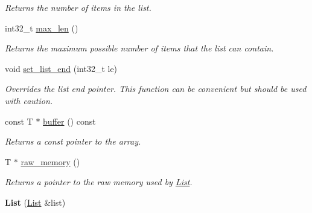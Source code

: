 \begin{DoxyCompactItemize}
\begin{DoxyCompactList}\small\item\em Returns the number of items in the list. \end{DoxyCompactList}\item 
\hypertarget{classetk_1_1_list_a360b0d7b0d8c3d48bfc976669cb12b24}{int32\-\_\-t \hyperlink{classetk_1_1_list_a360b0d7b0d8c3d48bfc976669cb12b24}{max\-\_\-len} ()}\label{classetk_1_1_list_a360b0d7b0d8c3d48bfc976669cb12b24}

\begin{DoxyCompactList}\small\item\em Returns the maximum possible number of items that the list can contain. \end{DoxyCompactList}\item 
\hypertarget{classetk_1_1_list_a35ccd11219bb888932e4957156bcab24}{void \hyperlink{classetk_1_1_list_a35ccd11219bb888932e4957156bcab24}{set\-\_\-list\-\_\-end} (int32\-\_\-t le)}\label{classetk_1_1_list_a35ccd11219bb888932e4957156bcab24}

\begin{DoxyCompactList}\small\item\em Overrides the list end pointer. This function can be convenient but should be used with caution. \end{DoxyCompactList}\item 
\hypertarget{classetk_1_1_list_a765da91f522c96c94efec3790b5a63b5}{const T $\ast$ \hyperlink{classetk_1_1_list_a765da91f522c96c94efec3790b5a63b5}{buffer} () const }\label{classetk_1_1_list_a765da91f522c96c94efec3790b5a63b5}

\begin{DoxyCompactList}\small\item\em Returns a const pointer to the array. \end{DoxyCompactList}\item 
\hypertarget{classetk_1_1_list_add87c29d6b7283b6329a01c3b1eae898}{T $\ast$ \hyperlink{classetk_1_1_list_add87c29d6b7283b6329a01c3b1eae898}{raw\-\_\-memory} ()}\label{classetk_1_1_list_add87c29d6b7283b6329a01c3b1eae898}

\begin{DoxyCompactList}\small\item\em Returns a pointer to the raw memory used by \hyperlink{classetk_1_1_list}{List}. \end{DoxyCompactList}\item 
\hypertarget{classetk_1_1_list_a23f9b0efe027159f914214d126b486b3}{{\bfseries List} (\hyperlink{classetk_1_1_list}{List} \&list)}\label{classetk_1_1_list_a23f9b0efe027159f914214d126b486b3}


\end{DoxyCompactItemize}
